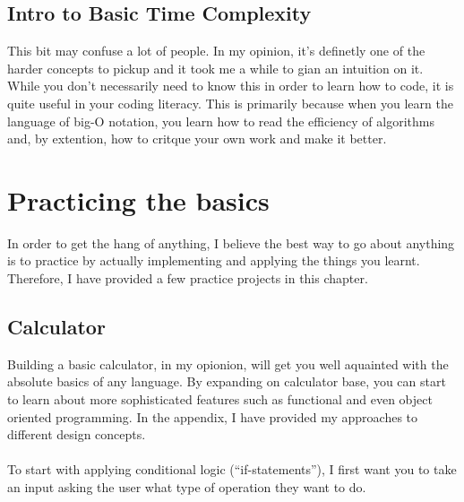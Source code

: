 \documentclass[12pt,a4paper]{book}
\begin{document}
		\section{Intro to Basic Time Complexity}
			This bit may confuse a lot of people. In my opinion, it's definetly one of the harder concepts to pickup and it took me a while to gian an intuition on it. While you don't necessarily need to know this in order to learn how to code, it is quite useful in your coding literacy. This is primarily because when you learn the language of big-O notation, you learn how to read the efficiency of algorithms and, by extention, how to critque your own work and make it better.
			
		
	\chapter{Practicing the basics}	\label{chap:basics-practice}
		In order to get the hang of anything, I believe the best way to go about anything is to practice by actually implementing and applying the things you learnt. Therefore, I have provided a few practice projects in this chapter.
		\section{Calculator}
			Building a basic calculator, in my opionion, will get you well aquainted with the absolute basics of any language. By expanding on calculator base, you can start to learn about more sophisticated features such as functional and even object oriented programming. In the appendix, I have provided my approaches to different design concepts.
			\\\\
			To start with applying conditional logic (``if-statements''), I first want you to take an input 
			asking the user what type of operation they want to do.
			
\end{document}
